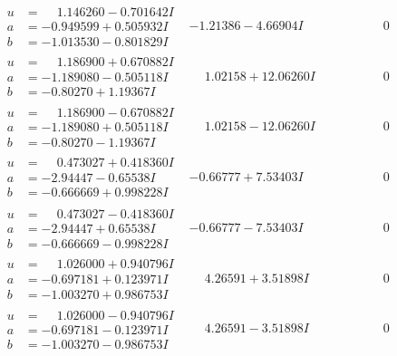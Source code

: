 \documentclass[1p]{elsarticle_modified}
\theoremstyle{definition}
\begin{document}
$$\begin{array}{c|c|c}
\begin{aligned}
u &= \phantom{-}1.146260 - 0.701642 I \\
a &= -0.949599 + 0.505932 I \\
b &= -1.013530 - 0.801829 I\end{aligned}
 & -1.21386 - 4.66904 I & \phantom{-0.000000 } 0 \\ \hline\begin{aligned}
u &= \phantom{-}1.186900 + 0.670882 I \\
a &= -1.189080 - 0.505118 I \\
b &= -0.80270 + 1.19367 I\end{aligned}
 & \phantom{-}1.02158 + 12.06260 I & \phantom{-0.000000 } 0 \\ \hline\begin{aligned}
u &= \phantom{-}1.186900 - 0.670882 I \\
a &= -1.189080 + 0.505118 I \\
b &= -0.80270 - 1.19367 I\end{aligned}
 & \phantom{-}1.02158 - 12.06260 I & \phantom{-0.000000 } 0 \\ \hline\begin{aligned}
u &= \phantom{-}0.473027 + 0.418360 I \\
a &= -2.94447 - 0.65538 I \\
b &= -0.666669 + 0.998228 I\end{aligned}
 & -0.66777 + 7.53403 I & \phantom{-0.000000 } 0 \\ \hline\begin{aligned}
u &= \phantom{-}0.473027 - 0.418360 I \\
a &= -2.94447 + 0.65538 I \\
b &= -0.666669 - 0.998228 I\end{aligned}
 & -0.66777 - 7.53403 I & \phantom{-0.000000 } 0 \\ \hline\begin{aligned}
u &= \phantom{-}1.026000 + 0.940796 I \\
a &= -0.697181 + 0.123971 I \\
b &= -1.003270 + 0.986753 I\end{aligned}
 & \phantom{-}4.26591 + 3.51898 I & \phantom{-0.000000 } 0 \\ \hline\begin{aligned}
u &= \phantom{-}1.026000 - 0.940796 I \\
a &= -0.697181 - 0.123971 I \\
b &= -1.003270 - 0.986753 I\end{aligned}
 & \phantom{-}4.26591 - 3.51898 I & \phantom{-0.000000 } 0\\

\end{array}$$
\end{document}
